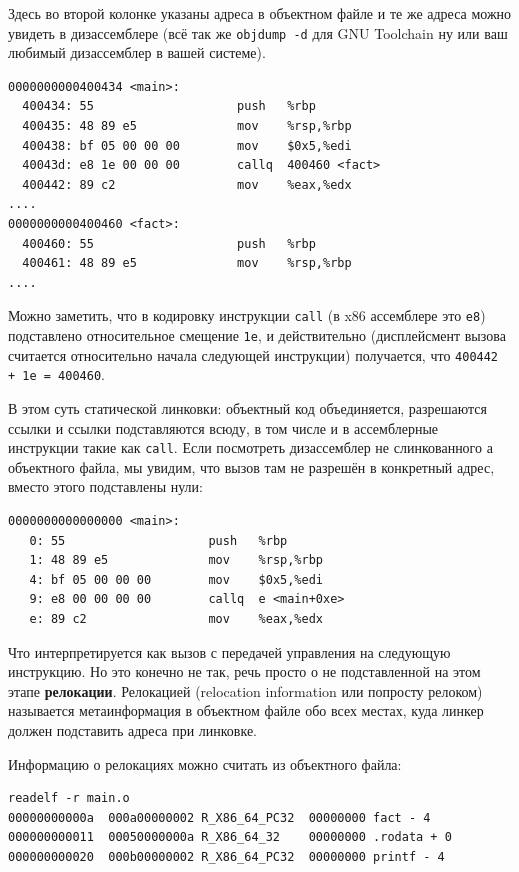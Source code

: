 \documentclass[a4paper,12pt,oneside]{article}
\begin{document}
Здесь во второй колонке указаны адреса в объектном файле и те же адреса можно увидеть в дизассемблере (всё так же \lstinline!objdump -d! для GNU Toolchain ну или ваш любимый дизассемблер в вашей системе).

\begin{verbatim}
0000000000400434 <main>:
  400434: 55                    push   %rbp
  400435: 48 89 e5              mov    %rsp,%rbp
  400438: bf 05 00 00 00        mov    $0x5,%edi
  40043d: e8 1e 00 00 00        callq  400460 <fact>
  400442: 89 c2                 mov    %eax,%edx
....
0000000000400460 <fact>:
  400460: 55                    push   %rbp
  400461: 48 89 e5              mov    %rsp,%rbp
....
\end{verbatim}

Можно заметить, что в кодировку инструкции \lstinline!сall! (в x86 ассемблере это \lstinline!e8!) подставлено относительное смещение \lstinline!1e!, и действительно (дисплейсмент вызова считается относительно начала следующей инструкции) получается, что \lstinline!400442 + 1e = 400460!.

В этом суть статической линковки: объектный код объединяется, разрешаются ссылки и ссылки подставляются всюду, в том числе и в ассемблерные инструкции такие как \lstinline!call!. Если посмотреть дизассемблер не слинкованного а объектного файла, мы увидим, что вызов там не разрешён в конкретный адрес, вместо этого подставлены нули:

\begin{verbatim}
0000000000000000 <main>:
   0: 55                    push   %rbp
   1: 48 89 e5              mov    %rsp,%rbp
   4: bf 05 00 00 00        mov    $0x5,%edi
   9: e8 00 00 00 00        callq  e <main+0xe>
   e: 89 c2                 mov    %eax,%edx
\end{verbatim}

Что интерпретируется как вызов с передачей управления на следующую инструкцию. Но это конечно не так, речь просто о не подставленной на этом этапе \textbf{релокации}. Релокацией (relocation information или попросту релоком) называется метаинформация в объектном файле обо всех местах, куда линкер должен подставить адреса при линковке.

Информацию о релокациях можно считать из объектного файла:

\begin{verbatim}
readelf -r main.o
00000000000a  000a00000002 R_X86_64_PC32  00000000 fact - 4
000000000011  00050000000a R_X86_64_32    00000000 .rodata + 0
000000000020  000b00000002 R_X86_64_PC32  00000000 printf - 4
\end{verbatim}
\end{document}
